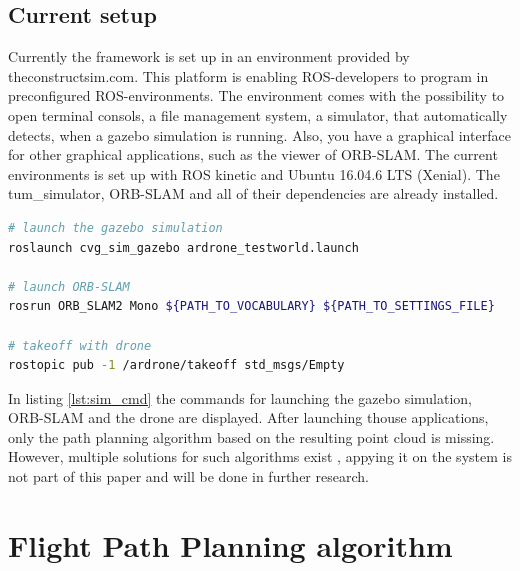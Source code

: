 	\subsection{Current setup}
	
	Currently the framework is set up in an environment provided by theconstructsim.com. This platform is enabling ROS-developers to program in preconfigured
	ROS-environments. The environment comes with the possibility to open terminal consols, a file management system, a simulator, that automatically 
	detects, when a gazebo simulation is running. Also, you have a graphical interface for other graphical applications, such as the viewer of ORB-SLAM.
	The current environments is set up with ROS kinetic and Ubuntu 16.04.6 LTS (Xenial). The tum\_simulator, ORB-SLAM and all of their dependencies are already installed. 
	
	\begin{lstlisting}[language=bash, caption=Launching the simulated environment, label=lst:sim_cmd]
# launch the gazebo simulation
roslaunch cvg_sim_gazebo ardrone_testworld.launch
	
# launch ORB-SLAM
rosrun ORB_SLAM2 Mono ${PATH_TO_VOCABULARY} ${PATH_TO_SETTINGS_FILE}
	
# takeoff with drone 
rostopic pub -1 /ardrone/takeoff std_msgs/Empty
	\end{lstlisting}
	
	In listing \ref{lst:sim_cmd} the commands for launching the gazebo simulation, ORB-SLAM and the drone are displayed. After launching thouse 
	applications, only the path planning algorithm based on the resulting point cloud is missing. However, multiple solutions for such algorithms 
	exist \cite{path}, appying it on the system is not part of this paper and will be done in further research. 
	
\section{Flight Path Planning algorithm}